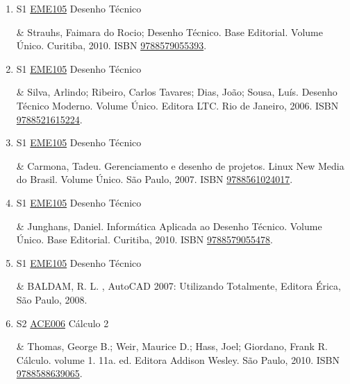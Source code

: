\documentclass[12pt,a4paper]{book}
\begin{document}
\begin{enumerate}
 

 \item S1 \hyperref[PUD:EME105]{EME105} Desenho Técnico

& Strauhs, Faimara do Rocio;  Desenho Técnico.  Base Editorial.  Volume Único.  Curitiba, 2010.  ISBN \href{http://www.bn.br/site/pages/servicosProfissionais/agenciaISBN/isbnBusca/FbnBuscaISBNCatalogo.asp?pField=ISBN&pIntPagina=1&pISBN=79055393&nidbISBN=true&hidbISBN=true}{9788579055393}. 

 

 \item S1 \hyperref[PUD:EME105]{EME105} Desenho Técnico

& Silva, Arlindo;  Ribeiro, Carlos Tavares;  Dias, João;  Sousa, Luís.  Desenho Técnico Moderno.  Volume Único.  Editora LTC.  Rio de Janeiro, 2006.  ISBN \href{http://www.bn.br/site/pages/servicosProfissionais/agenciaISBN/isbnBusca/FbnBuscaISBNCatalogo.asp?pField=ISBN&pIntPagina=1&pISBN=21615224&nidbISBN=true&hidbISBN=true}{9788521615224}.
 \item S1 \hyperref[PUD:EME105]{EME105} Desenho Técnico

& Carmona, Tadeu.  Gerenciamento e desenho de projetos.  Linux New Media do Brasil.  Volume Único.  São Paulo, 2007.  ISBN \href{http://www.bn.br/site/pages/servicosProfissionais/agenciaISBN/isbnBusca/FbnBuscaISBNCatalogo.asp?pField=ISBN&pIntPagina=1&pISBN=61024017&nidbISBN=true&hidbISBN=true}{9788561024017}. 

 

 \item S1 \hyperref[PUD:EME105]{EME105} Desenho Técnico

& Junghans, Daniel.  Informática Aplicada ao Desenho Técnico.  Volume Único.  Base Editorial.  Curitiba, 2010.  ISBN \href{http://www.bn.br/site/pages/servicosProfissionais/agenciaISBN/isbnBusca/FbnBuscaISBNCatalogo.asp?pField=ISBN&pIntPagina=1&pISBN=79055478&nidbISBN=true&hidbISBN=true}{9788579055478}. 

 

 \item S1 \hyperref[PUD:EME105]{EME105} Desenho Técnico

& BALDAM, R.  L. , AutoCAD 2007: Utilizando Totalmente, Editora Érica, São Paulo, 2008.
 \item S2 \hyperref[PUD:ACE006]{ACE006} Cálculo 2

& Thomas, George B.;  Weir, Maurice D.;  Hass, Joel;  Giordano, Frank R.  Cálculo.  volume 1.  11a.  ed.  Editora Addison Wesley.  São Paulo, 2010.  ISBN \href{http://www.bn.br/site/pages/servicosProfissionais/agenciaISBN/isbnBusca/FbnBuscaISBNCatalogo.asp?pField=ISBN&pIntPagina=1&pISBN=88639065&nidbISBN=true&hidbISBN=true}{9788588639065}. 


\end{enumerate}
\end{document}
